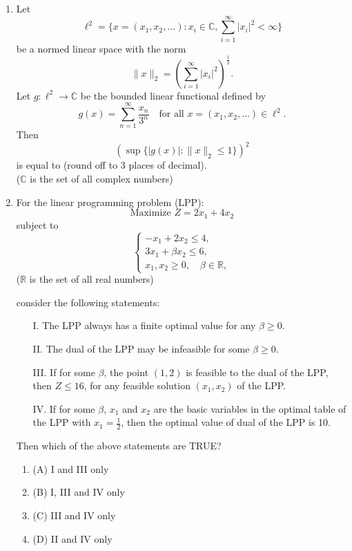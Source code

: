\documentclass[journal]{IEEEtran}
\numberwithin{equation}{enumi}
\numberwithin{figure}{enumi}
\begin{document}
\begin{enumerate}
\item Let
\[
\ell^2 = \{ x = (x_1, x_2, \dots) : x_i \in \mathbb{C}, \sum_{i=1}^{\infty} |x_i|^2 < \infty \}
\]
be a normed linear space with the norm
\[
\| x \|_2 = \left( \sum_{i=1}^{\infty} |x_i|^2 \right)^{\frac{1}{2}}.
\]
Let $g : \ell^2 \to \mathbb{C}$ be the bounded linear functional defined by
\[
g(x) = \sum_{n=1}^{\infty} \frac{x_n}{3^n} \quad \text{for all } x = (x_1, x_2, \dots) \in \ell^2.
\]
Then
\[
\left( \sup \{ |g(x)| : \| x \|_2 \leq 1 \} \right)^2
\]
is equal to \underline{\hspace{1cm}} (round off to 3 places of decimal). \\
($\mathbb{C}$ is the set of all complex numbers)
\bigskip

\item For the linear programming problem (LPP):
\[
\text{Maximize } Z = 2x_1 + 4x_2
\]
subject to
\[
\begin{cases}
-x_1 + 2x_2 \leq 4, \\
3x_1 + \beta x_2 \leq 6, \\
x_1, x_2 \geq 0, \quad \beta \in \mathbb{R},
\end{cases}
\]
($\mathbb{R}$ is the set of all real numbers)

consider the following statements:
\begin{enumerate}
    \item[I.] The LPP always has a finite optimal value for any $\beta \geq 0$.
    \item[II.] The dual of the LPP may be infeasible for some $\beta \geq 0$.
    \item[III.] If for some $\beta$, the point $(1,2)$ is feasible to the dual of the LPP, then $Z \leq 16$, for any feasible solution $(x_1, x_2)$ of the LPP.
    \item[IV.] If for some $\beta$, $x_1$ and $x_2$ are the basic variables in the optimal table of the LPP with $x_1 = \frac{1}{2}$, then the optimal value of dual of the LPP is 10.
\end{enumerate}

Then which of the above statements are TRUE?

\begin{enumerate}
    \item (A) I and III only
    \item (B) I, III and IV only
    \item (C) III and IV only
    \item (D) II and IV only
\end{enumerate}
\bigskip

\end{enumerate}
\end{document}
